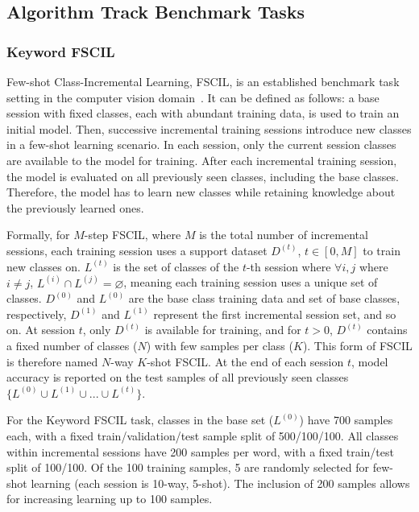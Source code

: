 \subsection*{Algorithm Track Benchmark Tasks}
\subsubsection*{Keyword FSCIL}
Few-shot Class-Incremental Learning, FSCIL, is an established benchmark task setting in the computer vision domain~\cite{tao2020fscil}. It can be defined as follows: a base session with fixed classes, each with abundant training data, is used to train an initial model. Then, successive incremental training sessions introduce new classes in a few-shot learning scenario. In each session, only the current session classes are available to the model for training. After each incremental training session, the model is evaluated on all previously seen classes, including the base classes. Therefore, the model has to learn new classes while retaining knowledge about the previously learned ones. 

Formally, for $M$-step FSCIL, where $M$ is the total number of incremental sessions, each training session uses a support dataset $D^{(t)}$, $t\in [0,M]$ to train new classes on. ${L^{(t)}}$ is the set of classes of the $t$-th session where $\forall i,j$  where $i \neq j$, $L^{(i)}\cap L^{(j)}=\varnothing$, meaning each training session uses a unique set of classes. $D^{(0)}$ and $L^{(0)}$ are the base class training data and set of base classes, respectively, $D^{(1)}$ and $L^{(1)}$ represent the first incremental session set, and so on. At session $t$, only $D^{(t)}$ is available for training, and for $t>0$, $D^{(t)}$ contains a fixed number of classes ($N$) with few samples per class ($K$). This form of FSCIL is therefore named $N$-way $K$-shot FSCIL. At the end of each session $t$, model accuracy is reported on the test samples of all previously seen classes $\{L^{(0)} \cup L^{(1)} \cup ... \cup L^{(t)}\}$.


For the Keyword FSCIL task, classes in the base set ($L^{(0)}$) have 700 samples each, with a fixed train/validation/test sample split of 500/100/100. All classes within incremental sessions have 200 samples per word, with a fixed train/test split of 100/100. Of the 100 training samples, 5 are randomly selected for few-shot learning (each session is 10-way, 5-shot). The inclusion of 200 samples allows for increasing learning up to 100 samples. 


